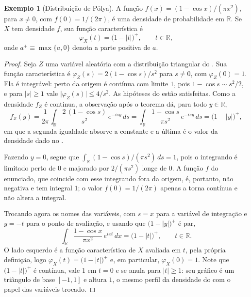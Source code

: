 \documentclass[12pt,portuguese]{article}
\theoremstyle{definition}
\newtheorem{example}[example]{Exemplo}
\theoremstyle{plainexercise}
\theoremstyle{starredexercise}
\theoremstyle{definition}
\begin{document}
\medskip

\begin{example}[Distribuição de Pólya]\label{ex:distribuicao-polya}
A função $f(x)=(1-\cos x)/(\pi x^{2})$, para $x\neq0$, com $f(0)=1/(2\pi)$, é uma
densidade de probabilidade em $\mathbb{R}$. Se $X$ tem densidade $f$, sua função
característica é
\[
\varphi_X(t)=\bigl(1-|t|\bigr)^{+}, \qquad t\in\mathbb{R},
\]
onde $a^{+}\equiv\max\{a,0\}$ denota a parte positiva de $a$.
\end{example}

\begin{proof}
Seja $Z$ uma variável aleatória com a distribuição triangular do
. Sua função característica é
$\varphi_Z(s)=2(1-\cos s)/s^{2}$ para $s\neq0$, com
$\varphi_Z(0)=1$. Ela é integrável: perto da origem é contínua com limite
$1$, pois $1-\cos s\sim s^{2}/2$, e para $|s|\geqslant1$ vale
$\bigl|\varphi_Z(s)\bigr|\leqslant4/s^{2}$. As hipóteses do
 estão satisfeitas. Como a densidade $f_Z$ é
contínua, a observação após o teorema dá, para todo $y\in\mathbb{R}$,
\[
f_Z(y)
=\frac{1}{2\pi}\int_{\mathbb{R}}\frac{2\,(1-\cos s)}{s^{2}}\,e^{-isy}\,ds
=\int_{\mathbb{R}}\frac{1-\cos s}{\pi s^{2}}\,e^{-isy}\,ds
=\bigl(1-|y|\bigr)^{+},
\]
em que a segunda igualdade absorve a constante e a última é o valor da densidade dado
no .

Fazendo $y=0$, segue que
$\int_{\mathbb{R}}(1-\cos s)/(\pi s^{2})\,ds=1$, pois o integrando é limitado perto de
$0$ e majorado por $2/(\pi s^{2})$ longe de $0$. A função $f$ do enunciado, que
coincide com esse integrando fora da origem, é, portanto, não negativa e tem integral
$1$; o valor $f(0)=1/(2\pi)$ apenas a torna contínua e não altera a integral.

Trocando agora os nomes das variáveis, com $s=x$ para a variável de integração e
$y=-t$ para o ponto de avaliação, e usando que $\bigl(1-|y|\bigr)^{+}$ é par,
\[
\int_{\mathbb{R}}\frac{1-\cos x}{\pi x^{2}}\,e^{ixt}\,dx
=\bigl(1-|t|\bigr)^{+}, \qquad t\in\mathbb{R}.
\]
O lado esquerdo é a função característica de $X$ avaliada em $t$, pela própria
definição, logo $\varphi_X(t)=\bigl(1-|t|\bigr)^{+}$ e, em particular, $\varphi_X(0)=1$.
Note que $\bigl(1-|t|\bigr)^{+}$ é contínua, vale $1$ em $t=0$ e se anula para
$|t|\geqslant1$: seu gráfico é um triângulo de base $[-1,1]$ e altura $1$, o mesmo
perfil da densidade do  com o papel das variáveis trocado.
\end{proof}
\end{document}
